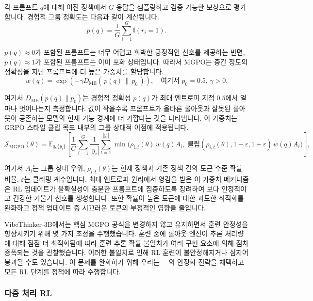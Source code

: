 \documentclass{article}
\begin{document}
각 프롬프트 $q$에 대해 이전 정책에서 $G$ 응답을 샘플링하고 검증 가능한 보상으로 평가합니다. 경험적 그룹 정확도는 다음과 같이 계산됩니다.
\begin{equation}
p(q)=\frac{1}{G}\sum_{i=1}^{G}\mathbb{I}(r_i=1).
\end{equation}

$p(q)\approx 0$가 포함된 프롬프트는 너무 어렵고 희박한 긍정적인 신호를 제공하는 반면, $p(q)\approx 1$가 포함된 프롬프트는 이미 포화 상태입니다. 따라서 MGPO는 중간 정도의 정확성을 지닌 프롬프트에 더 높은 가중치를 할당합니다.
\begin{equation}
w(q)=\exp\left(-\gamma D_{\mathrm{ME}}(\,p(q)\,\|\,p_0\,)\right),\quad \mathrm{여기서}\,\, p_0 = 0.5,\, \gamma > 0.
\end{equation}

여기서 $D_{\mathrm{ME}}(p(q)\|p_0)$는 경험적 정확성 $p(q)$가 최대 엔트로피 지점 $0.5$에서 얼마나 벗어나는지 측정합니다. 값이 작을수록 프롬프트가 올바른 롤아웃과 잘못된 롤아웃이 공존하는 모델의 현재 기능 경계에 더 가깝다는 것을 나타냅니다. 이 가중치는 GRPO 스타일 클립 목표 내부의 그룹 상대적 이점에 적용됩니다.
\begin{equation}
\mathcal{J}_{\mathrm{MGPO}}(\theta)
=
\mathbb{E}_{q,\{y_i\}}
\!\left[
\frac{1}{G}\sum_{i=1}^{G}
\frac{1}{|y_i|}\sum_{t=1}^{|y_i|}
\min\!\bigl(
\rho_{i,t}(\theta)\,w(q)A_i,\;
\mathrm{클립}(\rho_{i,t}(\theta),1\!-\!\varepsilon,1\!+\!\varepsilon)\,w(q)A_i
\bigr)
\right]\!,
\end{equation}

여기서 $A_i$는 그룹 상대 우위, $\rho_{i,t}(\theta)$는 현재 정책과 기존 정책 간의 토큰 수준 확률 비율, $\varepsilon$는 클리핑 계수입니다. 최대 엔트로피 원리에서 영감을 받은 이 가중치 메커니즘은 RL 업데이트가 불확실성이 충분한 프롬프트에 집중하도록 장려하여 보다 안정적이고 건강한 기울기 신호를 생성합니다. 또한 확률이 높은 토큰에 대한 과도한 최적화를 완화하고 정책 업데이트 중 시끄러운 토큰의 부정적인 영향을 줄입니다.


VibeThinker-3B에서는 핵심 MGPO 공식을 변경하지 않고 유지하면서 훈련 안정성을 향상시키기 위해 몇 가지 조정을 수행했습니다. 훈련 중에 롤아웃 엔진이 추론 처리량에 대해 점점 더 최적화됨에 따라 훈련-추론 확률 불일치가 여러 구현 요소에 의해 점차 증폭되는 것을 관찰했습니다. 이러한 불일치로 인해 RL 훈련이 불안정해지거나 심지어 붕괴될 수도 있습니다. 이 문제를 완화하기 위해 우리는 ~~\cite{fangkhazi2025mismatch,yao2025mismatch}의 안정화 전략을 채택하고 모든 RL 단계를 정책에 따라 수행합니다.

\subsubsection{다중 처리 RL}
\end{document}
